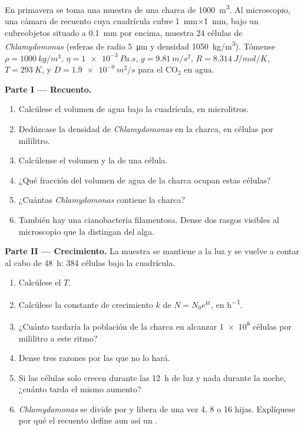 \begin{problem}
\label{pb:b2:unicellular-diversity:1}
En primavera se toma una muestra de una charca de \qty{1000}{m^3}. Al
microscopio, una cámara de recuento cuya cuadrícula cubre
\qty{1}{mm}$\times$\qty{1}{mm}, bajo un cubreobjetos situado a
\qty{0.1}{mm} por encima, muestra 24 células de \emph{Chlamydomonas}
(esferas de radio \qty{5}{\micro m} y densidad \qty{1050}{kg/m^3}).
Tómense $\rho = \qty{1000}{kg/m^3}$,
$\eta = \qty{1e-3}{Pa.s}$, $g = \qty{9.81}{m/s^2}$, $R =
\qty{8.314}{J/mol/K}$, $T = \qty{293}{K}$, y $D = \qty{1.9e-9}{m^2/s}$
para el $\mathrm{CO_2}$ en agua.

\medskip
\noindent\textbf{Parte I --- Recuento.}
\begin{enumerate}
  \item Calcúlese el volumen de agua bajo la cuadrícula, en microlitros.
  \item Dedúzcase la densidad de \emph{Chlamydomonas} en la charca, en
        células por mililitro.
  \item Calcúlense el volumen y la  de una
        célula.
  \item ¿Qué fracción del volumen de agua de la charca ocupan estas
        células?
  \item ¿Cuántas \emph{Chlamydomonas} contiene la charca?
  \item También hay una cianobacteria filamentosa. Dense dos rasgos
        visibles al microscopio que la distingan del alga.
\end{enumerate}

\medskip
\noindent\textbf{Parte II --- Crecimiento.}
La muestra se mantiene a la luz y se vuelve a contar al cabo de
\qty{48}{h}: \num{384} células bajo la cuadrícula.
\begin{enumerate}[resume]
  \item Calcúlese el  $T$.
  \item Calcúlese la constante de crecimiento $k$ de $N = N_0 e^{kt}$, en
        \unit{h^{-1}}.
  \item ¿Cuánto tardaría la población de la charca en alcanzar
        \qty{1e8}{} células por mililitro a este ritmo?
  \item Dense tres razones por las que no lo hará.
  \item Si las células solo crecen durante las \qty{12}{h} de luz y nada
        durante la noche, ¿cuánto tarda el mismo aumento?
  \item \emph{Chlamydomonas} se divide por  y libera de una
        vez 4, 8 o 16 hijas. Explíquese por qué el recuento define aun así
        un .
\end{enumerate}


\end{problem}
